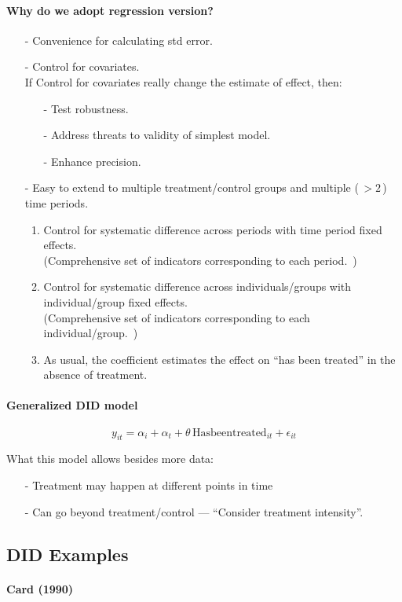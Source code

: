 \documentclass[a4paper,11pt]{article}
\newcommand{\myparagraph}[1]{\paragraph{#1}\mbox{}\par}
\begin{document}
\myparagraph{Why do we adopt regression version?}
\begin{itemize}
	\item[-] Convenience for calculating std error.
		\item[-] Control for covariates.\\
	If Control for covariates really change the estimate of effect, then:
	\begin{itemize}
		\item[-] Test robustness.
		\item[-] Address threats to validity of simplest model.
		\item[-] Enhance precision.
	\end{itemize}
	\item[-] Easy to extend to multiple treatment/control groups and multiple (\,$>\!2$\,) time periods.
		\begin{enumerate}
		\item Control for systematic difference across periods with time period fixed effects.\\
		(Comprehensive set of indicators corresponding to each period.~)
		\item Control for systematic difference across individuals/groups with individual/group fixed effects.\\ (Comprehensive set of indicators corresponding to each individual/group.~)
		\item As usual, the coefficient estimates the effect  on ``has been treated'' in the absence of treatment.
		\end{enumerate}
\end{itemize}


\myparagraph{Generalized DID model}

\begin{equation}
	y_{it} = \alpha _i + \alpha _t + \theta\, \mathrm{Hasbeentreated}_{it} + \epsilon_{it}
\end{equation}

What this model allows besides more data:
\begin{itemize}
	\item[-] Treatment may happen at different points in time
	\item[-] Can go beyond treatment/control --- ``Consider treatment intensity''.
\end{itemize}

\subsection{DID Examples}
\myparagraph{Card (1990)}
\end{document}
